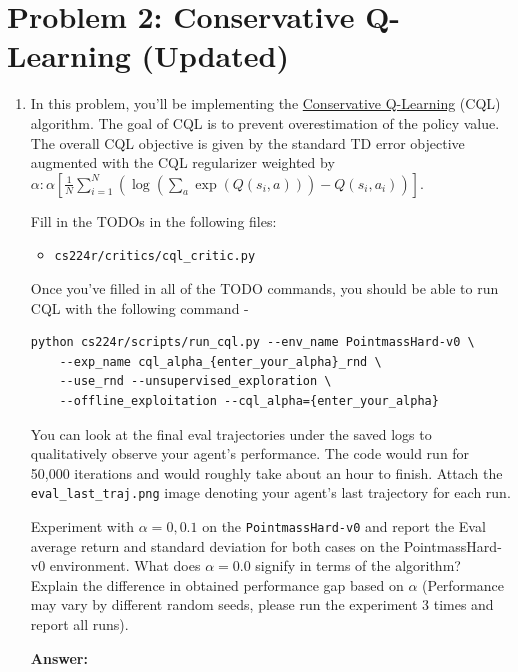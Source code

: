 \documentclass[12pt]{article}
\newcommand{\answer}[1]{{\bf \color{red}Answer:\\ #1}}
\begin{document}
\section*{Problem 2: Conservative Q-Learning (Updated)}
\begin{enumerate}
\item In this problem, you'll be implementing the \href{https://arxiv.org/abs/2006.04779}{Conservative Q-Learning} (CQL) algorithm. The goal of CQL is to prevent overestimation of the policy value. The overall CQL objective is given by the standard TD error objective augmented with the CQL regularizer weighted by $\alpha: \alpha\left[\frac{1}{N} \sum_{i=1}^N\left(\log \left(\sum_a \exp \left(Q\left(s_i, a\right)\right)\right)-Q\left(s_i, a_i\right)\right)\right]$. 

Fill in the TODOs in the following files:
\begin{itemize}
    \item \texttt{cs224r/critics/cql\_critic.py}
\end{itemize}

Once you’ve filled in all of the TODO commands, you should be able to run CQL with the following command - 
\begin{tcolorbox}[width=\linewidth, sharp corners=all, colback=white!95!black]
\begin{verbatim}
python cs224r/scripts/run_cql.py --env_name PointmassHard-v0 \
    --exp_name cql_alpha_{enter_your_alpha}_rnd \
    --use_rnd --unsupervised_exploration \
    --offline_exploitation --cql_alpha={enter_your_alpha}
\end{verbatim}
\end{tcolorbox}

\noindent
You can look at the final eval trajectories under the saved logs to qualitatively observe your agent's performance. The code would run for 50,000 iterations and would roughly take about an hour to finish. Attach the \texttt{eval\_last\_traj.png} image denoting your agent's last trajectory for each run.  %

\noindent
Experiment with $\alpha = 0, 0.1$ on the \texttt{PointmassHard-v0} and report the Eval average return and standard deviation for both cases on the PointmassHard-v0 environment. What does $\alpha=0.0$ signify in terms of the algorithm? Explain the difference in obtained performance gap based on $\alpha$ (Performance may vary by different random seeds, please run the experiment 3 times and report all runs).

\answer{}


\end{enumerate}
\end{document}

